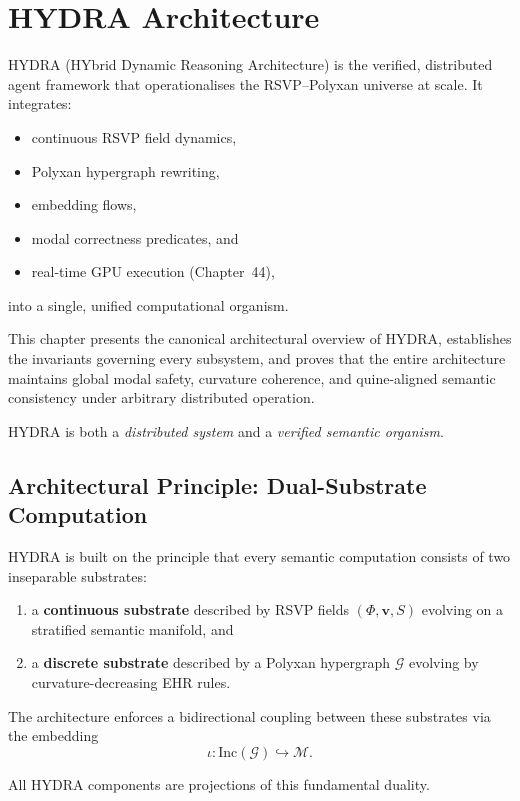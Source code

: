 \chapter{HYDRA Architecture}
\label{ch:45}

HYDRA (HYbrid Dynamic Reasoning Architecture) is the verified, distributed agent framework that operationalises the RSVP--Polyxan universe at scale.  
It integrates:
\begin{itemize}
\item continuous RSVP field dynamics,
\item Polyxan hypergraph rewriting,
\item embedding flows,
\item modal correctness predicates, and
\item real-time GPU execution (Chapter~44),
\end{itemize}
into a single, unified computational organism.

This chapter presents the canonical architectural overview of HYDRA, establishes the invariants governing every subsystem, and proves that the entire architecture maintains global modal safety, curvature coherence, and quine-aligned semantic consistency under arbitrary distributed operation.

HYDRA is both a \emph{distributed system} and a \emph{verified semantic organism}.

\section{Architectural Principle: Dual-Substrate Computation}

HYDRA is built on the principle that every semantic computation consists of two inseparable substrates:

\begin{enumerate}
\item a \textbf{continuous substrate} described by RSVP fields $(\Phi, \mathbf{v}, S)$ evolving on a stratified semantic manifold, and
\item a \textbf{discrete substrate} described by a Polyxan hypergraph $\mathcal{G}$ evolving by curvature-decreasing EHR rules.
\end{enumerate}

The architecture enforces a bidirectional coupling between these substrates via the embedding
\[
\iota : \mathrm{Inc}(\mathcal{G}) \hookrightarrow \mathcal{M}.
\]

All HYDRA components are projections of this fundamental duality.

